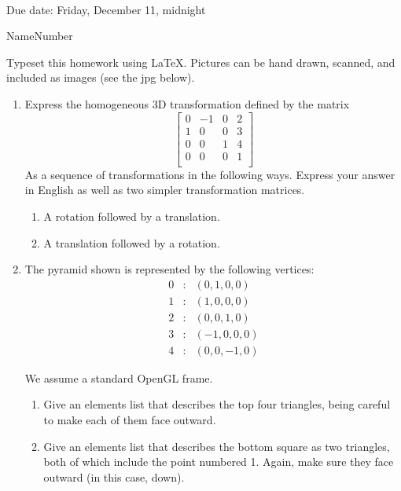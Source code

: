 \documentclass{article}
\begin{document}
\\Due date:  Friday, December 11, midnight
\bigskip

\noindent Name\hrulefill Number \hrulefill

Typeset this homework using \LaTeX.  Pictures can be hand drawn,
scanned, and included as images (see the jpg below).

\begin{enumerate}

\item Express the homogeneous 3D transformation defined by the matrix
  \[
\left[  \begin{array}{cccc}
    0 & -1 & 0 & 2 \\
    1 & 0 & 0 & 3 \\
    0 & 0 & 1 & 4 \\
    0 & 0 & 0 & 1\\\end{array}\right]
\]
As a sequence of transformations in the following ways.
Express your answer in English as well as two simpler transformation
matrices.
\begin{enumerate}
\item  A rotation followed by a translation.
\item A translation followed by a rotation.
  \end{enumerate}

\item
  \begin{multicols}{2}
    The pyramid shown is represented by the following vertices:
  \begin{eqnarray*}
    0 &:& (0,1,0,0)\\
    1 &:& (1,0,0,0)\\
    2 &:& (0,0,1,0)\\
    3 &:& (-1,0,0,0)\\
    4 &:& (0,0,-1,0)
    \end{eqnarray*}
\columnbreak
  \end{multicols}
    We assume a standard OpenGL frame.
  \begin{enumerate}
  \item
    Give an elements list that describes the top four triangles, being
  careful to make each of them face outward.
\item Give an elements list that describes the bottom square as two
  triangles, both of which include the point numbered 1.  Again, make
  sure they face outward (in this case, down).
  

\end{enumerate}
\end{enumerate}
\end{document}
